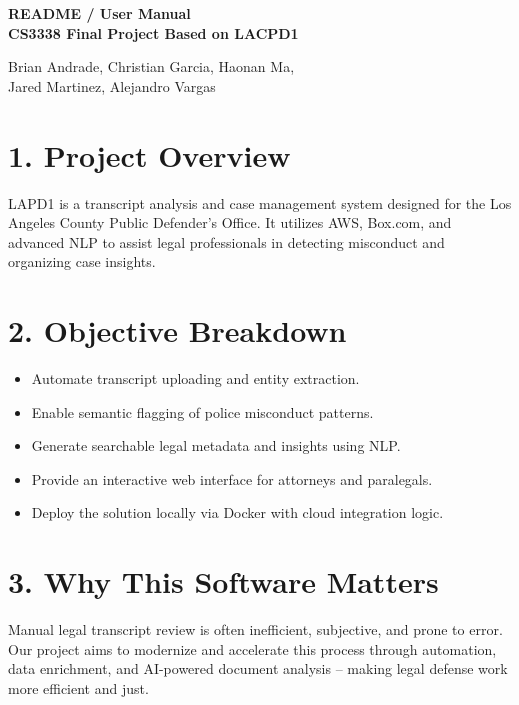 \documentclass[11pt]{article}
\begin{document}
\begin{titlepage}
    \centering
    \vspace*{\fill}

    {\Huge\textbf{README / User Manual} \\[1em]}
    {\Huge\textbf{CS3338 Final Project Based on LACPD1} \\[2em]}
    
    {\normalsize
    Brian Andrade, Christian Garcia, Haonan Ma,\\
    Jared Martinez, Alejandro Vargas
    }

    \vspace*{\fill}
    \thispagestyle{empty}
\end{titlepage}
\section*{1. Project Overview}
LAPD1 is a transcript analysis and case management system designed for the Los Angeles County Public Defender’s Office. It utilizes AWS, Box.com, and advanced NLP to assist legal professionals in detecting misconduct and organizing case insights.

\section*{2. Objective Breakdown}
\begin{itemize}
    \item Automate transcript uploading and entity extraction.
    \item Enable semantic flagging of police misconduct patterns.
    \item Generate searchable legal metadata and insights using NLP.
    \item Provide an interactive web interface for attorneys and paralegals.
    \item Deploy the solution locally via Docker with cloud integration logic.
\end{itemize}

\section*{3. Why This Software Matters}
Manual legal transcript review is often inefficient, subjective, and prone to error. Our project aims to modernize and accelerate this process through automation, data enrichment, and AI-powered document analysis -- making legal defense work more efficient and just.
\end{document}
